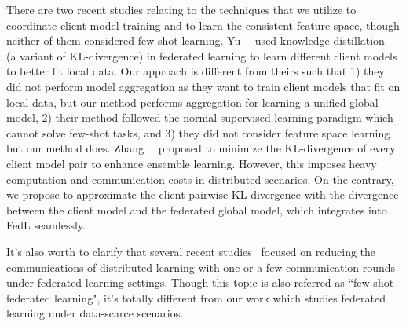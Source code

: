 There are two recent studies relating to the techniques that we utilize to coordinate client model training and to learn the consistent feature space, though neither of them considered few-shot learning.
Yu~\etal~\cite{yu2020salvaging} used knowledge distillation~\cite{hinton2015distilling} (a variant of KL-divergence) in federated learning to learn different client models to better fit local data. 
Our approach is different from theirs such that 1) they did not perform model aggregation as they want to train client models that fit on local data, but our method performs aggregation for learning a unified global model, 2) their method followed the normal supervised learning paradigm which cannot solve few-shot tasks, and 3) they did not consider feature space learning but our method does.
Zhang~\etal~\cite{zhang2018mutual} proposed to minimize the KL-divergence of every client model pair to enhance ensemble learning. However, this imposes heavy computation and communication costs in distributed scenarios. On the contrary, we propose to approximate the client pairwise KL-divergence with the divergence between the client model and the federated global model, which integrates into FedL seamlessly.


It's also worth to clarify that several recent studies~\cite{guha2019one, salehkaleybar2019one, shin2020xor} 
focused on reducing the communications of distributed learning with one or a few communication rounds under federated learning settings. Though this topic is also referred as ``few-shot federated learning", it's totally different from our work which studies federated learning under data-scarce scenarios.









